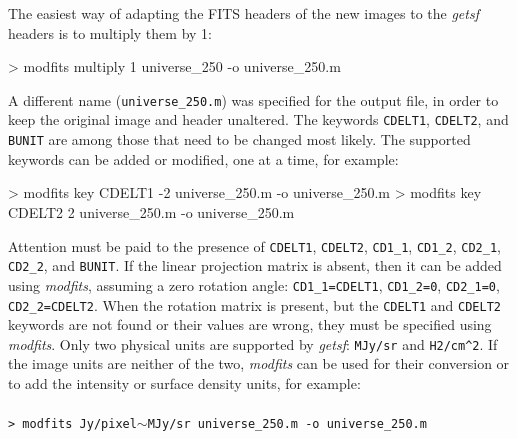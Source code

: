 \documentclass[a4paper,10pt]{article}
\begin{document}
The easiest way of adapting the FITS headers of the new images to the \textsl{getsf} headers is to multiply them by 1:
\begin{verbnobox}[\mbox{}\small]
> modfits multiply 1 universe_250 -o universe_250.m
\end{verbnobox}
A different name (\verb!universe_250.m!) was specified for the output file, in order to keep the original image and header
un\-altered. The keywords \verb!CDELT1!, \verb!CDELT2!, and \verb!BUNIT! are among those that need to be changed most likely. The
supported keywords can be added or modified, one at a time, for example:
\begin{verbnobox}[\mbox{}\small]
> modfits key CDELT1 -2 universe_250.m -o universe_250.m
> modfits key CDELT2 2 universe_250.m -o universe_250.m
\end{verbnobox}
Attention must be paid to the presence of \verb!CDELT1!, \verb!CDELT2!, \verb!CD1_1!, \verb!CD1_2!, \verb!CD2_1!, \verb!CD2_2!, and
\verb!BUNIT!. If the linear projection matrix is absent, then it can be added using \textsl{modfits}, assuming a zero rotation
angle: \verb!CD1_1=CDELT1!, \verb!CD1_2=0!, \verb!CD2_1=0!, \verb!CD2_2=CDELT2!. When the rotation matrix is present, but the
\verb!CDELT1! and \verb!CDELT2! keywords are not found or their values are wrong, they must be specified using \textsl{modfits}.
Only two physical units are supported by \textsl{getsf}: \verb!MJy/sr! and \verb!H2/cm^2!. If the image units are neither of the
two, \textsl{modfits} can be used for their conversion or to add the intensity or surface density units, for example:\\
\vspace{-2mm}\noindent\\
{\small\verb!> modfits Jy/pixel!$\sim$\verb!MJy/sr universe_250.m -o universe_250.m!}\\
\end{document}
